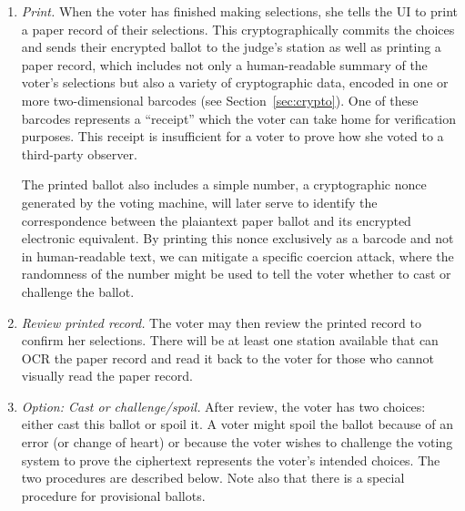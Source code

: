 \begin{enumerate}
\item {\em Print.} When the voter has finished making selections, she
  tells the UI to print a paper record of their selections. This
  cryptographically commits the choices and sends their encrypted
  ballot to the judge's station as well as printing a paper record,
  which includes not only a human-readable summary of the voter's
  selections but also a variety of cryptographic data, encoded in one or more
  two-dimensional barcodes (see Section~\ref{sec:crypto}).
  One of these barcodes represents a ``receipt'' which the voter can
  take home for verification purposes. This receipt is insufficient for a
  voter to prove how she voted to a third-party observer.

  The printed ballot also includes a simple number,
  a cryptographic nonce generated by the voting machine, will later serve to identify the
  correspondence between the plaiantext paper ballot and its encrypted electronic equivalent.
  By printing this nonce exclusively as a barcode and not in human-readable
  text, we can mitigate a specific coercion attack, where the
  randomness of the number might be used to tell the voter whether to
  cast or challenge the ballot.

% 

\item {\em Review printed record.}
The voter may then review the printed record to confirm her selections. There will be at least one station available that can OCR the paper record and read it back to the voter for those who cannot visually read the paper record.

\item {\em Option: Cast or challenge/spoil.}
After review, the voter has two choices: either cast this ballot or spoil it. A voter might spoil the ballot because of an error (or change of heart) or because the voter wishes to challenge the voting system to prove the ciphertext represents the voter's intended choices. The two procedures are described below. Note also that there is a special procedure for provisional ballots.


\end{enumerate}

